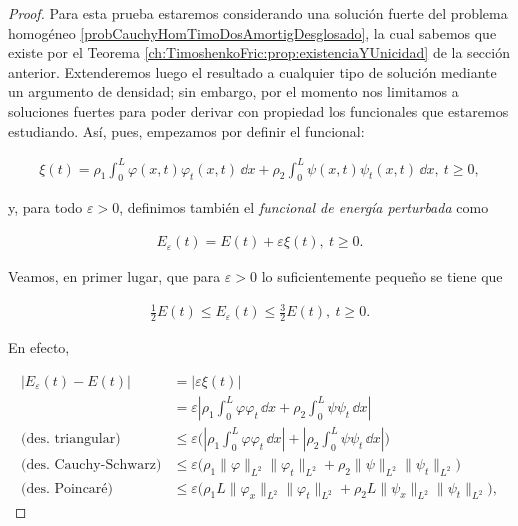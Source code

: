 \begin{proof}
    Para esta prueba estaremos considerando una solución fuerte del problema homogéneo \eqref{probCauchyHomTimoDosAmortigDesglosado}, la cual sabemos que existe por el Teorema \ref{ch:TimoshenkoFric:prop:existenciaYUnicidad} de la sección anterior. Extenderemos luego el resultado a cualquier tipo de solución mediante un argumento de densidad; sin embargo, por el momento nos limitamos a soluciones fuertes para poder derivar con propiedad los funcionales que estaremos estudiando. Así, pues, empezamos por definir el funcional:

    \begin{align}
    \label{funcionalAuxiliarXi}
        \xi(t) = \rho_1\int_0^L \varphi(x,t) \varphi_t(x,t) \, \dd x + \rho_2 \int_0^L \psi(x,t) \psi_t(x,t) \, \dd x, \ t \geq 0,
    \end{align}

    y, para todo $\varepsilon > 0$, definimos también el \textit{funcional de energía perturbada} como

    \begin{align}
        \label{dosDisip:energiaPerturbada}
        E_{\varepsilon}(t) = E(t) + \varepsilon\xi(t), \ t \geq 0.
    \end{align}

    Veamos, en primer lugar, que para $\varepsilon > 0$ lo suficientemente pequeño se tiene que

    \begin{align}
        \label{afirmacion1}
        \frac{1}{2}E(t) \leq E_\varepsilon(t) \leq \frac{3}{2}E(t), \ t \geq 0.
    \end{align}

    En efecto,

    \begin{align*}
        \lvert E_\varepsilon(t) - E(t)\lvert &= \lvert \varepsilon \xi(t) \lvert\\
        &=\varepsilon\left\lvert \rho_1\int_0^L \varphi\varphi_t \, \dd x + \rho_2 \int_0^L \psi\psi_t \, \dd x \right\lvert\\
        \text{(des. triangular)}&\leq \varepsilon\Bigg(\left\lvert \rho_1\int_0^L \varphi\varphi_t \, \dd x\right\lvert + \left\lvert\rho_2 \int_0^L \psi\psi_t \, \dd x \right\lvert\Bigg)\\
        \text{(des. Cauchy-Schwarz)}&\leq \varepsilon\Bigg( \rho_1 \lVert \varphi \rVert_{L^2} \lVert \varphi_t \rVert_{L^2} + \rho_2 \lVert\psi\rVert_{L^2} \lVert\psi_t\rVert_{L^2} \Bigg)\\
        \text{(des. Poincaré)}&\leq \varepsilon\Bigg( \rho_1L \lVert \varphi_x \rVert_{L^2} \lVert \varphi_t \rVert_{L^2} + \rho_2L\lVert\psi_x\rVert_{L^2} \lVert\psi_t\rVert_{L^2} \Bigg),
    \end{align*}


\end{proof}
